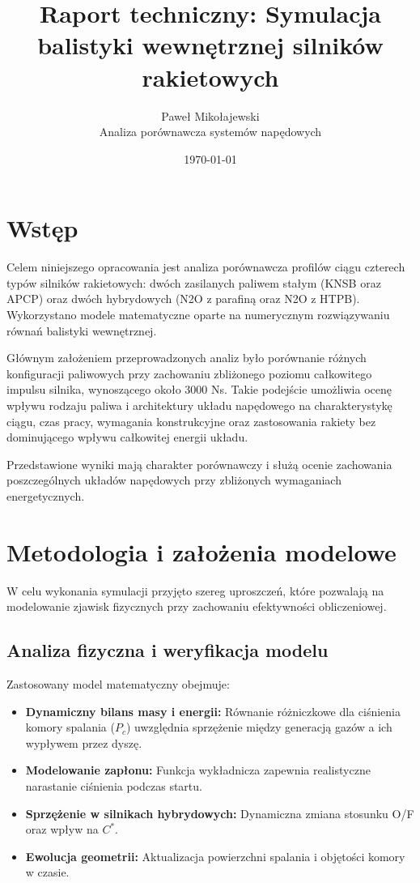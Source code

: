 \documentclass[a4paper,12pt]{article}
\title{\textbf{Raport techniczny: Symulacja balistyki wewnętrznej silników rakietowych}}
\author{Paweł Mikołajewski\\Analiza porównawcza systemów napędowych}
\date{\today}
\begin{document}
\maketitle
\newpage

\tableofcontents
\newpage

\section{Wstęp}

Celem niniejszego opracowania jest analiza porównawcza profilów ciągu czterech typów silników rakietowych: dwóch zasilanych paliwem stałym (KNSB oraz APCP) oraz dwóch hybrydowych (N2O z parafiną oraz N2O z HTPB). Wykorzystano modele matematyczne oparte na numerycznym rozwiązywaniu równań balistyki wewnętrznej.

Głównym założeniem przeprowadzonych analiz było porównanie różnych konfiguracji paliwowych przy zachowaniu zbliżonego poziomu całkowitego impulsu silnika, wynoszącego około 3000 Ns. Takie podejście umożliwia ocenę wpływu rodzaju paliwa i architektury układu napędowego na charakterystykę ciągu, czas pracy, wymagania konstrukcyjne oraz zastosowania rakiety bez dominującego wpływu całkowitej energii układu.

Przedstawione wyniki mają charakter porównawczy i służą ocenie zachowania poszczególnych układów napędowych przy zbliżonych wymaganiach energetycznych.

\section{Metodologia i założenia modelowe}

W celu wykonania symulacji przyjęto szereg uproszczeń, które pozwalają na modelowanie zjawisk fizycznych przy zachowaniu efektywności obliczeniowej.

\subsection{Analiza fizyczna i weryfikacja modelu}

Zastosowany model matematyczny obejmuje:

\begin{itemize}

    \item \textbf{Dynamiczny bilans masy i energii:} Równanie różniczkowe dla ciśnienia komory spalania ($P_c$) uwzględnia sprzężenie między generacją gazów a ich wypływem przez dyszę.

    \item \textbf{Modelowanie zapłonu:} Funkcja wykładnicza zapewnia realistyczne narastanie ciśnienia podczas startu.

    \item \textbf{Sprzężenie w silnikach hybrydowych:} Dynamiczna zmiana stosunku O/F oraz wpływ na $C^*$.

    \item \textbf{Ewolucja geometrii:} Aktualizacja powierzchni spalania i objętości komory w czasie.

\end{itemize}
\end{document}
